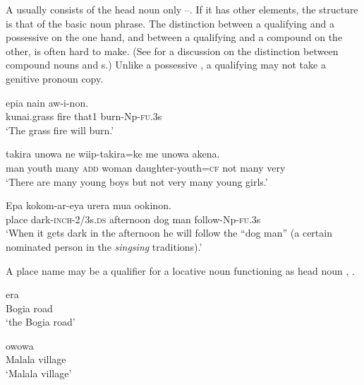  

A  usually consists of the head noun only --. If it has other elements, the structure is that of the basic noun phrase. The distinction between a qualifying  and a possessive  on the one hand, and between a qualifying  and a  compound on the other, is often hard to make. (See   for a discussion on the distinction between compound nouns and s.) Unlike a possessive , a qualifying  may not take a genitive pronoun copy. 

\ea%
\label{ex:4:x413}
\gll {} epia  nain  aw-i-non. \\
    kunai.grass  fire  that1  burn-Np-\textsc{fu}.3s  \\
\glt`The grass fire will burn.'
\z

\ea%
\label{ex:4:x412}
\gll {}  takira  unowa  ne   wiip-takira=ke me  unowa  akena.\\
  man  youth  many  \textsc{add}  woman  daughter-youth=\textsc{cf} not  many  very     \\
\glt`There are many young boys but not very many young girls.'
\z

\ea%
\label{ex:4:x1832}
\gll Epa  kokom-ar-eya  urera   mua ookinon. \\
    place  dark-\textsc{inch}-2/3s.\textsc{ds}  afternoon  dog  man  follow-Np-\textsc{fu}.3s  \\
\glt`When it gets dark in the afternoon he will follow the ``dog man'' (a certain nominated person in the \textit{singsing} traditions).'
\z

A place name may be a qualifier for a locative noun functioning as head noun , . 

\ea%
\label{ex:4:x834}
\gll {}  era \\
     Bogia  road \\
\glt`the Bogia road'
\z

\ea%
\label{ex:4:x833}
\gll {}  owowa \\
  Malala  village    \\
\glt`Malala village'
\z

